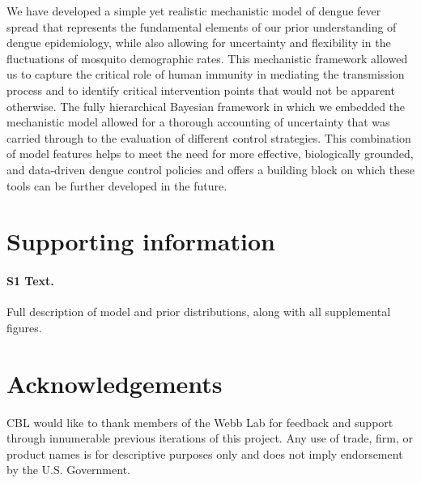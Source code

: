 \documentclass[10pt,letterpaper]{article}
\begin{document}
We have developed a simple yet realistic mechanistic model of dengue fever spread that represents the fundamental elements of our prior understanding of dengue epidemiology, while also allowing for uncertainty and flexibility in the fluctuations of mosquito demographic rates.
This mechanistic framework allowed us to capture the critical role of human immunity in mediating the transmission process and to identify critical intervention points that would not be apparent otherwise.
The fully hierarchical Bayesian framework in which we embedded the mechanistic model allowed for a thorough accounting of uncertainty that was carried through to the evaluation of different control strategies.
This combination of model features helps to meet the need for more effective, biologically grounded, and data-driven dengue control policies and offers a building block on which these tools can be further developed in the future.

\section*{Supporting information}

\paragraph*{S1 Text.}
\label{S1}
{Full description of model and prior distributions, along with all supplemental figures.}

\section*{Acknowledgements}

CBL would like to thank members of the Webb Lab for feedback and support through innumerable previous iterations of this project.
Any use of trade, firm, or product names is for descriptive purposes only and does not imply endorsement by the U.S. Government.

\nolinenumbers

%
%
% 



\end{document}
